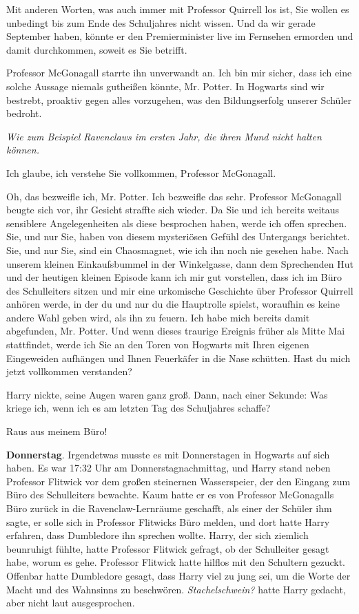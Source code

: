 \glqq Mit anderen Worten, was auch immer mit Professor Quirrell los ist, Sie
wollen es unbedingt bis zum Ende des Schuljahres nicht wissen. Und da wir gerade
September haben, könnte er den Premierminister live im Fernsehen ermorden und
damit durchkommen, soweit es Sie betrifft.\grqq{}

Professor McGonagall starrte ihn unverwandt an. \glqq Ich bin mir sicher, dass
ich eine solche Aussage niemals gutheißen könnte, Mr. Potter. In Hogwarts sind
wir bestrebt, proaktiv gegen alles vorzugehen, was den Bildungserfolg unserer
Schüler bedroht.\grqq{}

\emph{Wie zum Beispiel Ravenclaws im ersten Jahr, die ihren Mund nicht halten
können.}

\glqq Ich glaube, ich verstehe Sie vollkommen, Professor McGonagall.\grqq{}

\glqq Oh, das bezweifle ich, Mr. Potter. Ich bezweifle das sehr.\grqq{}
Professor McGonagall beugte sich vor, ihr Gesicht straffte sich wieder. \glqq Da
Sie und ich bereits weitaus sensiblere Angelegenheiten als diese besprochen
haben, werde ich offen sprechen. Sie, und nur Sie, haben von diesem mysteriösen
Gefühl des Untergangs berichtet. Sie, und nur Sie, sind ein Chaosmagnet, wie ich
ihn noch nie gesehen habe. Nach unserem kleinen Einkaufsbummel in der
Winkelgasse, dann dem Sprechenden Hut und der heutigen kleinen Episode kann ich
mir gut vorstellen, dass ich im Büro des Schulleiters sitzen und mir eine
urkomische Geschichte über Professor Quirrell anhören werde, in der du und nur
du die Hauptrolle spielst, woraufhin es keine andere Wahl geben wird, als ihn zu
feuern. Ich habe mich bereits damit abgefunden, Mr. Potter. Und wenn dieses
traurige Ereignis früher als Mitte Mai stattfindet, werde ich Sie an den Toren
von Hogwarts mit Ihren eigenen Eingeweiden aufhängen und Ihnen Feuerkäfer in die
Nase schütten. Hast du mich jetzt vollkommen verstanden?\grqq{}

Harry nickte, seine Augen waren ganz groß. Dann, nach einer Sekunde: \glqq Was
kriege ich, wenn ich es am letzten Tag des Schuljahres schaffe?\grqq{}

\glqq Raus aus meinem Büro!\grqq{}

\textbf{Donnerstag}. Irgendetwas musste es mit Donnerstagen in Hogwarts auf sich
haben. Es war 17:32 Uhr am Donnerstagnachmittag, und Harry stand neben Professor
Flitwick vor dem großen steinernen Wasserspeier, der den Eingang zum Büro des
Schulleiters bewachte. Kaum hatte er es von Professor McGonagalls Büro zurück in
die Ravenclaw-Lernräume geschafft, als einer der Schüler ihm sagte, er solle
sich in Professor Flitwicks Büro melden, und dort hatte Harry erfahren, dass
Dumbledore ihn sprechen wollte. Harry, der sich ziemlich beunruhigt fühlte,
hatte Professor Flitwick gefragt, ob der Schulleiter gesagt habe, worum es gehe.
Professor Flitwick hatte hilflos mit den Schultern gezuckt. Offenbar hatte
Dumbledore gesagt, dass Harry viel zu jung sei, um die Worte der Macht und des
Wahnsinns zu beschwören. \emph{Stachelschwein?} hatte Harry gedacht, aber nicht
laut ausgesprochen.

